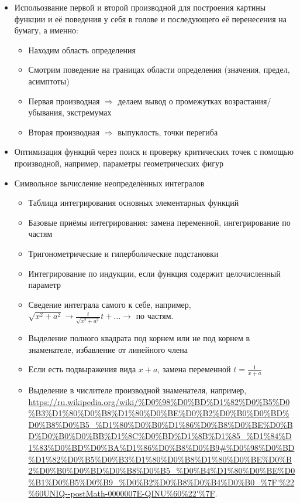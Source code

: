 \documentclass[12pt, a4paper]{article}
\begin{document}
  \begin{itemize}
    \item Испольозвание первой и второй производной для построения картины функции и её поведения 
    у себя в голове и последующего её перенесения на бумагу, а именно:
    \begin{itemize}
      \item Находим область определения
      \item Смотрим поведение на границах области определения (значения, предел, асимптоты)
      \item Первая производная $\Longrightarrow$ делаем вывод о промежутках возрастания/убывания, экстремумах
      \item Вторая производная $\Longrightarrow$ выпуклость, точки перегиба
    \end{itemize}
    \item Оптимизация функций через поиск и проверку критических точек с помощью производной, например, параметры геометрических фигур
    \item Символьное вычисление неопределённых интегралов
    \begin{itemize}
      \item Таблица интегрирования основных элементарных функций
      \item Базовые приёмы интегрирования: замена переменной, ингегрирование по частям
      \item Тригонометрические и гиперболические подстановки
      \item Интегрирование по индукции, если функция содержит целочисленный параметр
      \item Сведение интеграла самого к себе, например, $\sqrt{x^2 + a^2} \rightarrow \frac{t}{\sqrt{x^2 + a^2}} t + \ldots \rightarrow$ по частям.
      \item Выделение полного квадрата под корнем или не под корнем в знаменателе, избавление от линейного члена
      \item Если есть подвыражения вида $x + a$, замена переменной $t = \frac{1}{x + a}$
      \item Выделение в числителе производной знаменателя, например, \url{https://ru.wikipedia.org/wiki/%D0%98%D0%BD%D1%82%D0%B5%D0%B3%D1%80%D0%B8%D1%80%D0%BE%D0%B2%D0%B0%D0%BD%D0%B8%D0%B5_%D1%80%D0%B0%D1%86%D0%B8%D0%BE%D0%BD%D0%B0%D0%BB%D1%8C%D0%BD%D1%8B%D1%85_%D1%84%D1%83%D0%BD%D0%BA%D1%86%D0%B8%D0%B9#%D0%98%D0%BD%D1%82%D0%B5%D0%B3%D1%80%D0%B8%D1%80%D0%BE%D0%B2%D0%B0%D0%BD%D0%B8%D0%B5_%D0%B4%D1%80%D0%BE%D0%B1%D0%B5%D0%B9_%D0%B2%D0%B8%D0%B4%D0%B0_%7F'%22%60UNIQ--postMath-0000007E-QINU%60%22'%7F}.

\end{itemize}
\end{itemize}
\end{document}
